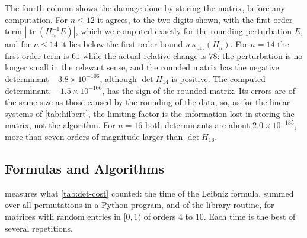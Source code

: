 The fourth column shows the damage done by storing the matrix, before any computation. For $n\le12$ it agrees, to the two digits shown, with the first-order term $|\operatorname{tr}(H_n^{-1}E)|$, which we computed exactly for the rounding perturbation $E$, and for $n\le14$ it lies below the first-order bound $u\,\kappa_{\det}(H_n)$. For $n=14$ the first-order term is $61$ while the actual relative change is $78$: the perturbation is no longer small in the relevant sense, and the rounded matrix has the negative determinant $-3.8\times10^{-106}$, although $\det H_{14}$ is positive. The computed determinant, $-1.5\times10^{-106}$, has the sign of the rounded matrix. Its errors are of the same size as those caused by the rounding of the data, so, as for the linear systems of \cref{tab:hilbert}, the limiting factor is the information lost in storing the matrix, not the algorithm. For $n=16$ both determinants are about $2.0\times10^{-135}$, more than seven orders of magnitude larger than $\det H_{16}$.

\subsection{Formulas and Algorithms}

 measures what \cref{tab:det-cost} counted: the time of the Leibniz formula, summed over all permutations in a Python program, and of the library routine, for matrices with random entries in $[0,1)$ of orders $4$ to $10$. Each time is the best of several repetitions.

\begin{table}
\end{table}

